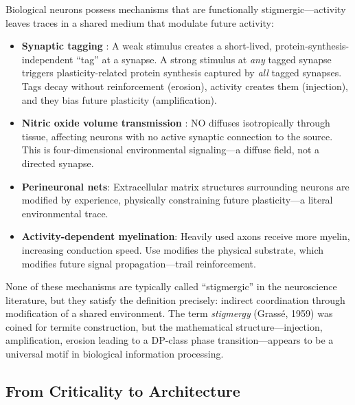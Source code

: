 \documentclass[11pt,a4paper]{article}
\begin{document}
Biological neurons possess mechanisms that are functionally
stigmergic---activity leaves traces in a shared medium that modulate
future activity:

\begin{itemize}
    \item \textbf{Synaptic tagging} \cite{frey1997}: A weak stimulus
          creates a short-lived, protein-synthesis-independent ``tag''
          at a synapse.  A strong stimulus at \emph{any} tagged synapse
          triggers plasticity-related protein synthesis captured by
          \emph{all} tagged synapses.  Tags decay without reinforcement
          (erosion), activity creates them (injection), and they bias
          future plasticity (amplification).

    \item \textbf{Nitric oxide volume transmission}
          \cite{bhatt2000,philippides2005}: NO diffuses isotropically
          through tissue, affecting neurons with no active synaptic
          connection to the source.  This is four-dimensional
          environmental signaling---a diffuse field, not a directed
          synapse.

    \item \textbf{Perineuronal nets}: Extracellular matrix structures
          surrounding neurons are modified by experience, physically
          constraining future plasticity---a literal environmental
          trace.

    \item \textbf{Activity-dependent myelination}: Heavily used axons
          receive more myelin, increasing conduction speed.  Use
          modifies the physical substrate, which modifies future signal
          propagation---trail reinforcement.
\end{itemize}

None of these mechanisms are typically called ``stigmergic'' in the
neuroscience literature, but they satisfy the definition precisely:
indirect coordination through modification of a shared environment.
The term \emph{stigmergy} (Grass\'{e}, 1959) was coined for termite
construction, but the mathematical structure---injection, amplification,
erosion leading to a DP-class phase transition---appears to be a
universal motif in biological information processing.

\subsection{From Criticality to Architecture}
\end{document}
